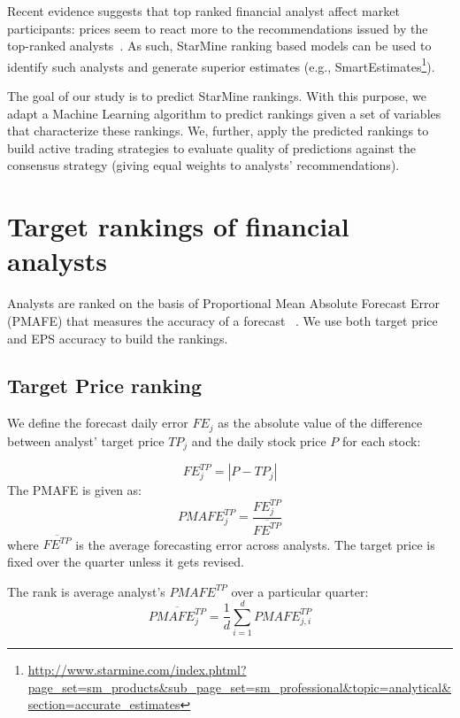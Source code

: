 \documentclass[12pt,a4paper]{article}\usepackage[]{graphicx}\usepackage[]{color}
\begin{document}
Recent evidence suggests that top ranked financial analyst affect market participants: prices seem to react more to the recommendations issued by the top-ranked analysts~\citep{emery2009}. As such, StarMine ranking based models can be used to identify such analysts and generate superior estimates (e.g., SmartEstimates\footnote{\url{http://www.starmine.com/index.phtml?page_set=sm_products&sub_page_set=sm_professional&topic=analytical&section=accurate_estimates}}).



The goal of our study is to predict  StarMine rankings. With this purpose, we adapt a Machine Learning  algorithm to predict rankings  given a set of variables that characterize these rankings. We, further, apply the predicted rankings  to build active trading strategies to evaluate quality of predictions against the consensus strategy (giving equal weights to analysts' recommendations).






\section{Target rankings of financial analysts}
\label{ch4:sec-tr}
 Analysts are ranked on the basis of Proportional Mean Absolute Forecast Error (PMAFE) that measures the accuracy of a forecast ~\citep{clement1999,brown2001,ertimur2007}. We use both target price and EPS accuracy to build the rankings.

\subsection{Target Price ranking}
\label{ch4:rank}
 We define the forecast daily error  $FE_{j}$ as the absolute value of the difference between analyst' target price $TP_{j}$ and the daily stock price $P$ for each stock:

\begin{equation}
	\label{ch4-dfe}
	FE_{j}^{TP}=|{P-TP_{j}}|
\end{equation}
The PMAFE is given as:
\begin{equation}
	\label{ch4-tp:pmafe}
	PMAFE_{j}^{TP}=\frac{FE_{j}^{TP}}{\overline{FE^{TP}}}
\end{equation}
where $\overline{{FE}^{TP}}$ is the average forecasting error across analysts. The target price is fixed over the quarter unless it gets revised.

The rank is average analyst's $PMAFE^{TP}$ over a particular quarter:
\begin{equation}
	\overline{PMAFE_{j}^{TP}}=\frac{1}{d} \sum_{i=1}^{d} PMAFE_{j,i}^{TP}
\end{equation}
\end{document}
